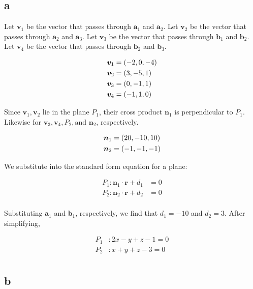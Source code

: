 \documentclass{article}
\begin{document}


\subsection*{a}

Let $\bm{v}_1$ be the vector that passes through $\bm{a}_1$ and $\bm{a}_2$.
Let $\bm{v}_2$ be the vector that passes through $\bm{a}_2$ and $\bm{a}_3$.
Let $\bm{v}_3$ be the vector that passes through $\bm{b}_1$ and $\bm{b}_2$.
Let $\bm{v}_4$ be the vector that passes through $\bm{b}_2$ and $\bm{b}_3$.

\begin{align*}
  \bm{v}_1 &= \left ( -2, 0, -4 \right) \\
  \bm{v}_2 &= \left ( 3, -5, 1 \right) \\
  \bm{v}_3 &= \left ( 0, -1, 1 \right) \\
  \bm{v}_4 &= \left ( -1, 1, 0 \right) \\
\end{align*}

Since $\bm{v}_1, \bm{v}_2$ lie in the plane $P_1$, their cross product $\bm{n}_1$ is perpendicular to $P_1$.
Likewise for $\bm{v}_3, \bm{v}_4, P_2, \text{and }\bm{n}_2$, respectively.

\begin{align*}
  \bm{n}_1 &= \left ( 20, -10, 10 \right) \\
  \bm{n}_2 &= \left ( -1, -1, -1 \right) \\
\end{align*}

We substitute into the standard form equation for a plane:

\begin{align*}
  P_1 : \bm{n}_1 \cdot \bm{r} + d_1 &= 0 \\
  P_2 : \bm{n}_2 \cdot \bm{r} + d_2 &= 0 \\
\end{align*}

Substituting $\bm{a}_1$ and $\bm{b}_1$, respectively, we find that $d_1 = -10$ and $d_2 = 3$.
After simplifying,

\begin{align*}
  P_1 &: \boxed{2x - y + z - 1 = 0} \\
  P_2 &: \boxed{x + y + z - 3 = 0} \\
\end{align*}


\subsection*{b}
\end{document}
